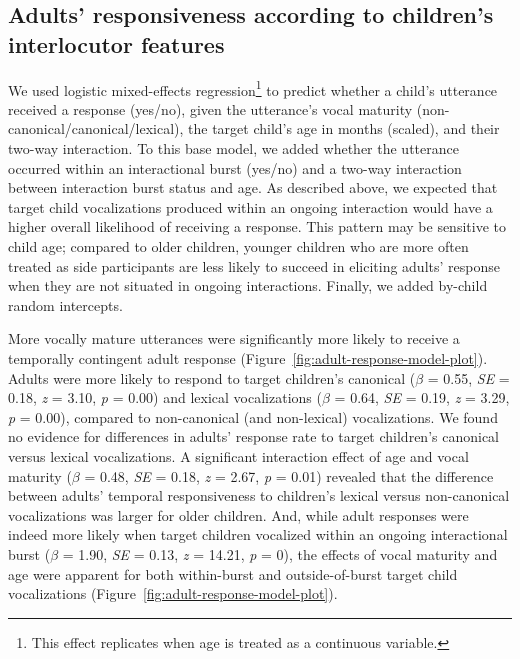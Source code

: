 \documentclass[
  man]{apa6}
\begin{document}
\hypertarget{adults-responsiveness-according-to-childrens-interlocutor-features}{%
\subsection{Adults' responsiveness according to children's interlocutor features}\label{adults-responsiveness-according-to-childrens-interlocutor-features}}

We used logistic mixed-effects regression\footnote{This effect replicates when age is treated as a continuous variable.} to predict whether a child's utterance received a response (yes/no), given the utterance's vocal maturity (non-canonical/canonical/lexical), the target child's age in months (scaled), and their two-way interaction. To this base model, we added whether the utterance occurred within an interactional burst (yes/no) and a two-way interaction between interaction burst status and age. As described above, we expected that target child vocalizations produced within an ongoing interaction would have a higher overall likelihood of receiving a response. This pattern may be sensitive to child age; compared to older children, younger children who are more often treated as side participants are less likely to succeed in eliciting adults' response when they are not situated in ongoing interactions. Finally, we added by-child random intercepts.

More vocally mature utterances were significantly more likely to receive a temporally contingent adult response (Figure~\ref{fig:adult-response-model-plot}). Adults were more likely to respond to target children's canonical (\(\beta\) = 0.55, \emph{SE} = 0.18, \emph{z} = 3.10, \emph{p} = 0.00) and lexical vocalizations (\(\beta\) = 0.64, \emph{SE} = 0.19, \emph{z} = 3.29, \emph{p} = 0.00), compared to non-canonical (and non-lexical) vocalizations. We found no evidence for differences in adults' response rate to target children's canonical versus lexical vocalizations. A significant interaction effect of age and vocal maturity (\(\beta\) = 0.48, \emph{SE} = 0.18, \emph{z} = 2.67, \emph{p} = 0.01) revealed that the difference between adults' temporal responsiveness to children's lexical versus non-canonical vocalizations was larger for older children. And, while adult responses were indeed more likely when target children vocalized within an ongoing interactional burst (\(\beta\) = 1.90, \emph{SE} = 0.13, \emph{z} = 14.21, \emph{p} = 0), the effects of vocal maturity and age were apparent for both within-burst and outside-of-burst target child vocalizations (Figure~\ref{fig:adult-response-model-plot}).
\end{document}
